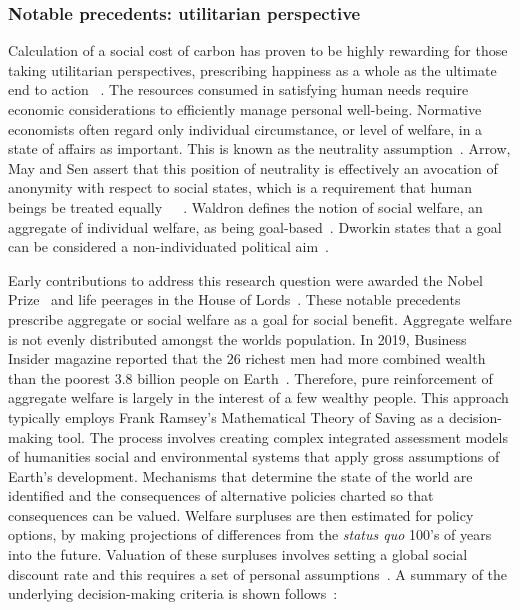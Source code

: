 \documentclass[11pt, oneside]{article}   	%
\begin{document}
\subsubsection{Notable precedents: utilitarian perspective}

Calculation of a social cost of carbon has proven to be highly rewarding for those taking utilitarian perspectives, prescribing happiness as a whole as the ultimate end to action ~\cite{hs1}. The resources consumed in satisfying human needs require economic considerations to efficiently manage personal well-being. Normative economists often regard only individual circumstance, or level of  welfare, in a state of affairs as important. This is known as the neutrality assumption~\cite{pd2}. Arrow, May and Sen assert that this position of neutrality is effectively an avocation of anonymity with respect to social states, which is a requirement that human beings be treated equally~\cite{ka1}~\cite{km1}~\cite{as2}. Waldron defines the notion of social welfare, an aggregate of individual welfare, as being goal-based~\cite{jw2}. Dworkin states that a goal can be considered a non-individuated political aim~\cite{rd1}.

Early contributions to address this research question were awarded the Nobel Prize~\cite{np1} and life peerages in the House of Lords~\cite{g1}. These notable precedents prescribe aggregate or social welfare as a goal for social benefit. Aggregate welfare is not evenly distributed amongst the worlds population. In 2019, Business Insider magazine reported that the 26 richest men had more combined wealth than the poorest 3.8 billion people on Earth~\cite{bi1}. Therefore, pure reinforcement of aggregate welfare is largely in the interest of a few wealthy people. This approach typically employs Frank Ramsey's Mathematical Theory of Saving as a decision-making tool. The process involves creating complex integrated assessment models of humanities social and environmental systems that apply gross assumptions of Earth's development. Mechanisms that determine the state of the world are identified and the consequences of alternative policies charted so that consequences can be valued. Welfare surpluses are then estimated for policy options, by making projections of differences from the \emph{status quo} 100's of years into the future. Valuation of these surpluses involves setting a global social discount rate and this requires a set of personal assumptions~\cite{pd2}. A summary of the underlying decision-making criteria is shown follows~\cite{fr1}:
\end{document}
